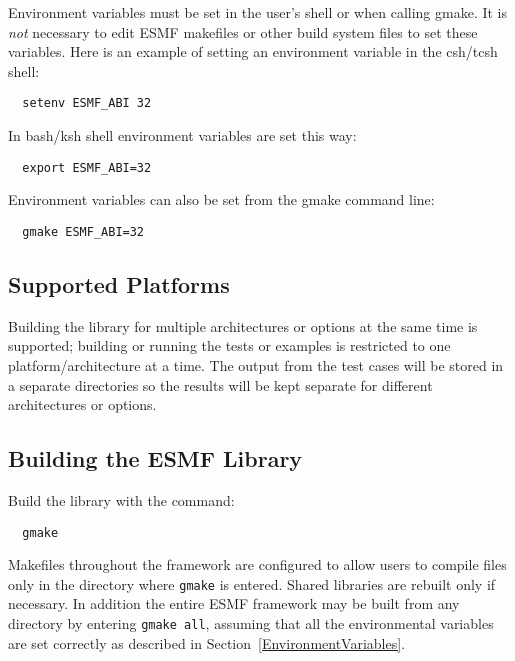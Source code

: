 Environment variables must be set in the user's shell or when calling gmake. It
is {\em not} necessary to edit ESMF makefiles or other build system files to set
these variables. Here is an example of setting an environment variable in the
csh/tcsh shell:

\begin{verbatim}
  setenv ESMF_ABI 32
\end{verbatim}

In bash/ksh shell environment variables are set this way:

\begin{verbatim}
  export ESMF_ABI=32
\end{verbatim}

Environment variables can also be set from the gmake command line:

\begin{verbatim}
  gmake ESMF_ABI=32
\end{verbatim}

\subsection{Supported Platforms}


Building the library for multiple architectures or options at the same
time is supported; building or running the tests or examples is restricted
to one platform/architecture at a time.  The output from the test cases
will be stored in a separate directories so the results will be kept 
separate for different architectures or options.

\subsection{Building the ESMF Library}
\label{BuildESMF}



Build the library with the command:
\begin{verbatim}
  gmake 
\end{verbatim}


Makefiles throughout the framework are configured to allow users to
compile files only in the directory where {\tt gmake} is entered. Shared
libraries are rebuilt only if necessary. In addition the entire ESMF
framework may be built from any directory by entering {\tt gmake all},
assuming that all the environmental variables are set correctly as
described in Section~\ref{EnvironmentVariables}.

